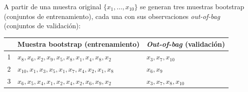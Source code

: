 \begin{ejemplo}
  A partir de una muestra original $\{x_1,\ldots,x_{10}\}$ se generan tres muestras bootstrap
  (conjuntos de entrenamiento), cada una con sus observaciones \emph{out-of-bag} (conjuntos de
  validación):
  \begin{center}
    \renewcommand{\arraystretch}{1.2}
    \begin{tabular}{lll}
      \toprule
      & Muestra bootstrap (entrenamiento) & \emph{Out-of-bag} (validación) \\
      \midrule
      1 & $x_8,x_6,x_2,x_9,x_5,x_8,x_1,x_4,x_8,x_2$ & $x_3,x_7,x_{10}$ \\
      2 & $x_{10},x_1,x_3,x_5,x_1,x_7,x_4,x_2,x_1,x_8$ & $x_6,x_9$ \\
      3 & $x_6,x_5,x_4,x_1,x_2,x_4,x_2,x_6,x_9,x_2$ & $x_3,x_7,x_8,x_{10}$ \\
      \bottomrule
    \end{tabular}
  \end{center}
\end{ejemplo}
